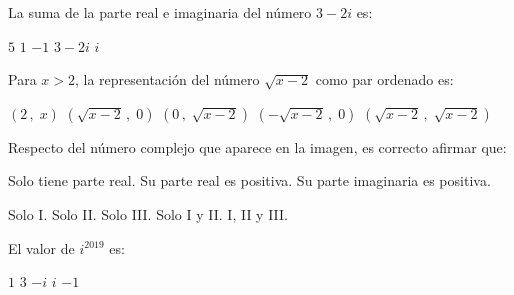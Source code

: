 \documentclass[]{srs}
\begin{document}
\begin{preguntas}[after-item-skip=2cm]
 \pregunta La suma de la parte real e imaginaria del número $3-2i$ es:\\
 \begin{vertical}
  \alternativa $5$
  \alternativa $1$
  \alternativa $-1$
  \alternativa $3-2i$
  \alternativa $i$
 \end{vertical}

 \pregunta Para $x > 2$, la representación del número $\sqrt{x-2}$ como par ordenado es:\\
\begin{vertical}
  \alternativa $\left(2\,,\;x\right)$
  \alternativa $\left(\sqrt{x-2}\,,\;0\right)$
  \alternativa $\left(0\,,\;\sqrt{x-2}\right)$
  \alternativa $\left(-\sqrt{x-2}\,,\;0\right)$
  \alternativa $\left(\sqrt{x-2}\,,\;\sqrt{x-2}\right)$
\end{vertical}

 \pregunta Respecto del número complejo que aparece en la imagen, es correcto
 afirmar que:\\
\begin{center}
\end{center}
\begin{vertical*}
  \alternativa Solo tiene parte real.
  \alternativa Su parte real es positiva.
  \alternativa Su parte imaginaria es positiva.
\end{vertical*}
\begin{vertical}
  \alternativa Solo I.
  \alternativa Solo II.
  \alternativa Solo III.
  \alternativa Solo I y II.
  \alternativa I, II y III.
\end{vertical}

\pregunta El valor de $i^{2019}$ es:\\
\begin{vertical}
  \alternativa $1$
  \alternativa $3$
  \alternativa $-i$
  \alternativa $i$
  \alternativa $-1$
\end{vertical}


\end{preguntas}
\end{document}
